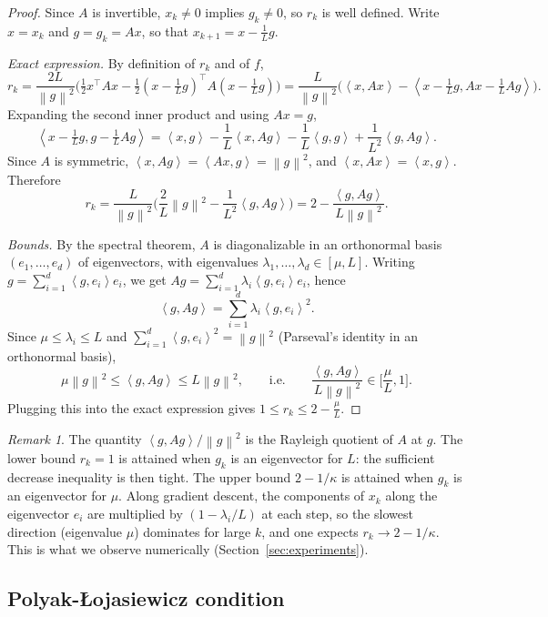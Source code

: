 \documentclass[11pt,a4paper]{article}
\theoremstyle{definition}
\theoremstyle{remark}
\newtheorem{remark}{Remark}
\newcommand{\norm}[1]{\left\lVert #1 \right\rVert}
\newcommand{\ip}[2]{\left\langle #1, #2 \right\rangle}
\begin{document}
\begin{proof}
Since $A$ is invertible, $x_k \neq 0$ implies $g_k \neq 0$, so $r_k$ is well defined. Write $x = x_k$ and $g = g_k = Ax$, so that $x_{k+1} = x - \frac{1}{L} g$.

\emph{Exact expression.} By definition of $r_k$ and of $f$,
\[
r_k = \frac{2L}{\norm{g}^2}\Big(\tfrac12 x^\top A x - \tfrac12 (x - \tfrac1L g)^\top A (x - \tfrac1L g)\Big)
= \frac{L}{\norm{g}^2}\Big(\ip{x}{Ax} - \ip{x - \tfrac1L g}{Ax - \tfrac1L Ag}\Big).
\]
Expanding the second inner product and using $Ax = g$,
\[
\ip{x - \tfrac1L g}{g - \tfrac1L Ag} = \ip{x}{g} - \frac1L \ip{x}{Ag} - \frac1L \ip{g}{g} + \frac{1}{L^2}\ip{g}{Ag}.
\]
Since $A$ is symmetric, $\ip{x}{Ag} = \ip{Ax}{g} = \norm{g}^2$, and $\ip{x}{Ax} = \ip{x}{g}$. Therefore
\[
r_k = \frac{L}{\norm{g}^2}\Big(\frac{2}{L}\norm{g}^2 - \frac{1}{L^2}\ip{g}{Ag}\Big) = 2 - \frac{\ip{g}{Ag}}{L\norm{g}^2}.
\]

\emph{Bounds.} By the spectral theorem, $A$ is diagonalizable in an orthonormal basis $(e_1, \dots, e_d)$ of eigenvectors, with eigenvalues $\lambda_1, \dots, \lambda_d \in [\mu, L]$. Writing $g = \sum_{i=1}^d \ip{g}{e_i} e_i$, we get $Ag = \sum_{i=1}^d \lambda_i \ip{g}{e_i} e_i$, hence
\[
\ip{g}{Ag} = \sum_{i=1}^d \lambda_i \ip{g}{e_i}^2 .
\]
Since $\mu \le \lambda_i \le L$ and $\sum_{i=1}^d \ip{g}{e_i}^2 = \norm{g}^2$ (Parseval's identity in an orthonormal basis),
\[
\mu \norm{g}^2 \le \ip{g}{Ag} \le L \norm{g}^2, \qquad\text{i.e.}\qquad \frac{\ip{g}{Ag}}{L\norm{g}^2} \in \Big[\frac{\mu}{L}, 1\Big].
\]
Plugging this into the exact expression gives $1 \le r_k \le 2 - \frac{\mu}{L}$.
\end{proof}

\begin{remark}
The quantity $\ip{g}{Ag}/\norm{g}^2$ is the Rayleigh quotient of $A$ at $g$. The lower bound $r_k = 1$ is attained when $g_k$ is an eigenvector for $L$: the sufficient decrease inequality is then tight. The upper bound $2 - 1/\kappa$ is attained when $g_k$ is an eigenvector for $\mu$. Along gradient descent, the components of $x_k$ along the eigenvector $e_i$ are multiplied by $(1 - \lambda_i/L)$ at each step, so the slowest direction (eigenvalue $\mu$) dominates for large $k$, and one expects $r_k \to 2 - 1/\kappa$. This is what we observe numerically (Section~\ref{sec:experiments}).
\end{remark}

\subsection{Polyak-{\L}ojasiewicz condition}\label{sec:pl}
\end{document}

